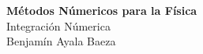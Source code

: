 \documentclass[twoside]{article}
\begin{document}
\thispagestyle{plainfirst}

\begin{tcolorbox}[portada]
    \centering
    {\Huge \bfseries Métodos Númericos para la Física}\\[0.5cm]
    {\LARGE Integración Númerica}\\[0.5cm]
    {\large Benjamín Ayala Baeza}
\end{tcolorbox}
\end{document}
